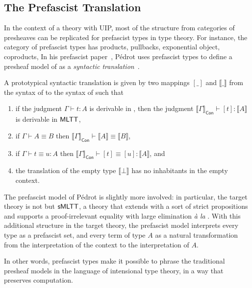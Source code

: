 \subsection{The Prefascist Translation}
\label{sec:PMP_translation}

In the context of a theory with UIP, most of the structure from categories of
presheaves can be replicated for prefascist types in type theory. For instance,
the category of prefascist types has products, pullbacks, exponential object,
coproducts, \etc
% 
In his prefascist paper~, Pédrot uses prefascist 
types to define a presheaf model of \MLTT as a \emph{syntactic 
translation}~.

A prototypical syntactic translation is given by two mappings \( [\_] \) and
\( \llbracket \_ \rrbracket \) from the syntax of \MLTT to the syntax of 
\MLTT such that
% 
\begin{enumerate}
\item if the judgment \( \Gamma \vdash t : A \) is derivable in \MLTT, then 
the judgment
\( {\llbracket \Gamma \rrbracket_{\mathsf{Con}} \vdash [t] : \llbracket A \rrbracket} \)
is derivable in \( \mathsf{MLTT} \), 
\item if \( \Gamma \vdash A \equiv B \) then
\( {\llbracket \Gamma \rrbracket_{\mathsf{Con}} \vdash \llbracket A \rrbracket \equiv \llbracket B \rrbracket} \),
\item if \( \Gamma \vdash t \equiv u : A \) then
\( {\llbracket \Gamma \rrbracket_{\mathsf{Con}} \vdash [t] \equiv [u] : \llbracket A \rrbracket} \), and
\item the translation of the empty type \( \llbracket \bot \rrbracket \) has no 
inhabitants in the empty context.
\end{enumerate}
% 

The prefascist model of Pédrot is slightly more involved: in particular, the target theory
is not \MLTT but \( \mathsf{sMLTT} \), a theory that extends \MLTT with a sort of 
strict propositions and supports a proof-irrelevant equality with large
elimination \emph{à la} \Lean.
% 
With this additional structure in the target theory, the prefascist model
interprets every type as a prefascist set, and every term of type \( A \) as a 
natural transformation from the interpretation of the context to the 
interpretation of \( A \).

In other words, prefascist types make it possible to phrase the traditional
presheaf models in the language of intensional type theory, in a way that 
preserves computation.

